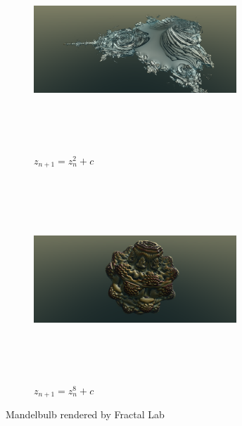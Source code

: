 \begin{figure}[h!tbp]
 \begin{subfigure}{0.49\hsize}
   \begin{center}
    \includegraphics[width=3in, height=3in, keepaspectratio]{../img/fractal/mandelbulb2.pdf}
    \caption{$z_{n + 1} = z_n^2 + c$}
    \label{fig:mandelbulb2}
   \end{center}
 \end{subfigure}
 \hspace*{\fill}
 \begin{subfigure}{0.49\hsize}
   \begin{center}
    \includegraphics[width=3in, height=3in, keepaspectratio]{../img/fractal/mandelbulb8.pdf}
    \caption{$z_{n+1} = z_n^8 + c$}
    \label{fig:mandelbulb8}
   \end{center}
 \end{subfigure}
 \caption{Mandelbulb rendered by Fractal Lab}
\end{figure}

